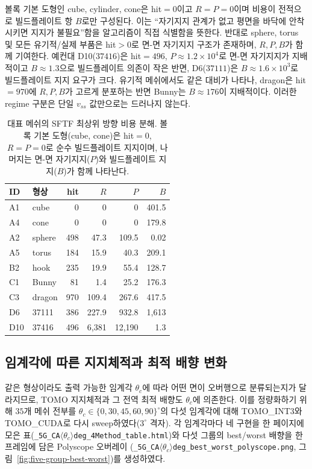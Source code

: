 \documentclass[11pt,a4paper]{article}
\begin{document}
볼록 기본 도형인 cube, cylinder, cone은 hit$=0$이고 $R=P=0$이며 비용이
전적으로 빌드플레이트 항 $B$로만 구성된다.
이는 ``자기지지 관계가 없고 평면을 바닥에 안착시키면 지지가 불필요''함을
알고리즘이 직접 식별함을 뜻한다.
반대로 sphere, torus 및 모든 유기적/실제 부품은 hit$>0$로 면-면 자기지지 구조가 존재하며,
$R,P,B$가 함께 기여한다.
예컨대 D10($37416$)은 hit$=496$, $P\approx1.2\times10^4$로 면-면 자기지지가 지배적이고
$B\approx1.3$으로 빌드플레이트 의존이 작은 반면,
D6($37111$)은 $B\approx1.6\times10^3$로 빌드플레이트 지지 요구가 크다.
유기적 메쉬에서도 같은 대비가 나타나, dragon은 hit$=970$에 $R,P,B$가 고르게 분포하는 반면
Bunny는 $B\approx176$이 지배적이다.
이러한 regime 구분은 단일 $v_{ss}$ 값만으로는 드러나지 않는다.

\begin{table}[H]
\centering
\caption{대표 메쉬의 SFTF 최상위 방향 비용 분해.
볼록 기본 도형(cube, cone)은 hit$=0$, $R=P=0$로 순수 빌드플레이트 지지이며,
나머지는 면-면 자기지지($P$)와 빌드플레이트 지지($B$)가 함께 나타난다.}
\label{tab:fivegroup-structure}
\begin{tabular}{llrrrr}
\toprule
ID & 형상 & hit & $R$ & $P$ & $B$\\
\midrule
A1  & cube     & 0   & 0       & 0        & 401.5\\
A4  & cone     & 0   & 0       & 0        & 179.8\\
A2  & sphere   & 498 & 47.3    & 109.5    & 0.02\\
A5  & torus    & 184 & 15.9    & 40.3     & 209.1\\
B2  & hook     & 235 & 19.9    & 55.4     & 128.7\\
C1  & Bunny    & 81  & 1.4     & 25.2     & 176.3\\
C3  & dragon   & 970 & 109.4   & 267.6    & 417.5\\
D6  & 37111    & 386 & 227.9   & 932.8    & 1{,}613\\
D10 & 37416    & 496 & 6{,}381 & 12{,}190 & 1.3\\
\bottomrule
\end{tabular}
\end{table}

\subsection{임계각에 따른 지지체적과 최적 배향 변화}
\label{sec:critangle}

같은 형상이라도 출력 가능한 임계각 $\theta_c$에 따라 어떤 면이 오버행으로 분류되는지가 달라지므로,
TOMO 지지체적과 그 전역 최적 배향도 $\theta_c$에 의존한다.
이를 정량화하기 위해 $35$개 메쉬 전부를 $\theta_c\in\{0,30,45,60,90\}^\circ$의 다섯 임계각에 대해
TOMO\_INT3와 TOMO\_CUDA로 다시 sweep하였다($3^\circ$ 격자).
각 임계각마다 네 구현을 한 페이지에 모은 표(\texttt{\_5G\_CA$\langle\theta_c\rangle$deg\_4Method\_table.html})와
다섯 그룹의 best/worst 배향을 한 프레임에 담은 Polyscope 오버레이
(\texttt{\_5G\_CA$\langle\theta_c\rangle$deg\_best\_worst\_polyscope.png}, 그림~\ref{fig:five-group-best-worst})를 생성하였다.
\end{document}
